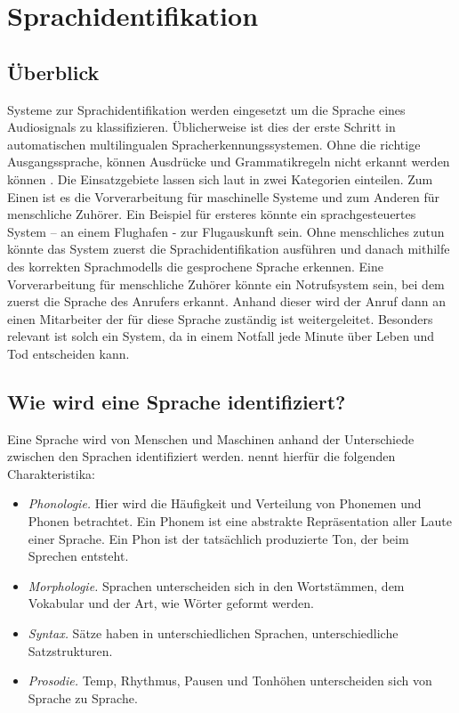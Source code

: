 \section{Sprachidentifikation}
\subsection{Überblick}
Systeme zur Sprachidentifikation werden eingesetzt um die Sprache eines Audiosignals zu klassifizieren. Üblicherweise ist dies der erste Schritt in automatischen multilingualen Spracherkennungssystemen.
Ohne die richtige Ausgangssprache, können Ausdrücke und Grammatikregeln nicht erkannt werden können \cite{Bartz.2017}.
Die Einsatzgebiete lassen sich laut \cite{Zissman.2001} in zwei Kategorien einteilen. Zum Einen ist es die Vorverarbeitung für maschinelle Systeme und zum Anderen für menschliche Zuhörer. Ein Beispiel für ersteres könnte ein sprachgesteuertes System – an einem Flughafen - zur Flugauskunft sein. Ohne menschliches zutun könnte das System zuerst die Sprachidentifikation ausführen und danach mithilfe des korrekten Sprachmodells die gesprochene Sprache erkennen.
Eine Vorverarbeitung für menschliche Zuhörer könnte ein Notrufsystem sein, bei dem zuerst die Sprache des Anrufers erkannt. Anhand dieser wird der Anruf dann an einen Mitarbeiter der für diese Sprache zuständig ist weitergeleitet. Besonders relevant ist solch ein System, da in einem Notfall jede Minute über Leben und Tod entscheiden kann.

\subsection{Wie wird eine Sprache identifiziert?}
Eine Sprache wird von Menschen und Maschinen anhand der Unterschiede zwischen den Sprachen identifiziert werden. \cite{Zissman.2001} nennt hierfür die folgenden Charakteristika:
\begin{itemize}
\item \textit{Phonologie.} Hier wird die Häufigkeit und Verteilung von Phonemen und Phonen betrachtet. Ein Phonem ist eine abstrakte Repräsentation aller Laute einer Sprache. Ein Phon ist der tatsächlich produzierte Ton, der beim Sprechen entsteht.
\item \textit{Morphologie.} Sprachen unterscheiden sich in den Wortstämmen, dem Vokabular und der Art, wie Wörter geformt werden.
\item \textit{Syntax.} Sätze haben in unterschiedlichen Sprachen, unterschiedliche Satzstrukturen.
\item \textit{Prosodie.} Temp, Rhythmus, Pausen und Tonhöhen unterscheiden sich von Sprache zu Sprache.
\end{itemize}

